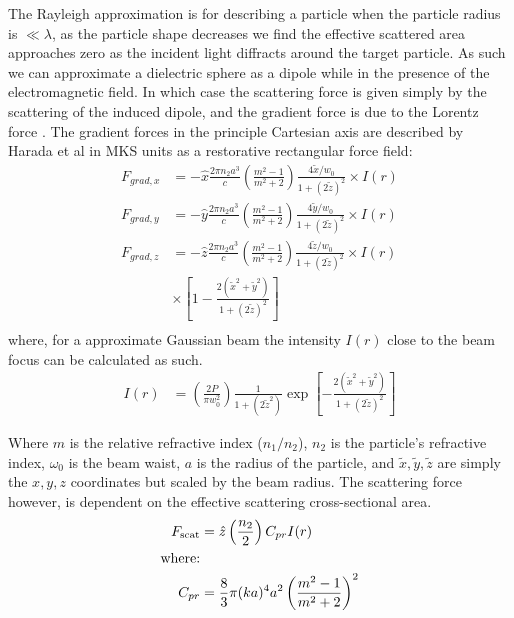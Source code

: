 The Rayleigh approximation is for describing a particle when 
the particle radius is $\ll \lambda$, as the particle shape 
decreases we find the effective scattered area approaches 
zero as the incident light diffracts around the target particle. 
As such we can approximate a dielectric sphere as a dipole while 
in the presence of the electromagnetic field. In which case the 
scattering force is given simply by the scattering of the induced 
dipole, and the gradient force is due to the Lorentz force 
\cite{Gordon1973}. The gradient forces in the principle Cartesian 
axis are described by Harada et al \cite{YasuhiroHarada1996} in MKS 
units as a restorative rectangular force field:
\begin{align}
  F_{grad,x}
  &=-\hat{x} \frac{2\pi n_2 a^3}{c}
    \left(\frac{m^2-1}{m^2+2}\right) \frac{4\tilde{x}/w_0}{1+(2\tilde{z})^2} \times I(r)
  \label{eq:Rayleigh_start}\\
  F_{grad,y}
  &=-\hat{y} \frac{2\pi n_2 a^3}{c}
    \left(\frac{m^2-1}{m^2+2}\right) \frac{4\tilde{y}/w_0}{1+(2\tilde{z})^2} \times I(r)
  \\
  F_{grad,z}
  &=-\hat{z} \frac{2\pi n_2 a^3}{c}
    \left(\frac{m^2-1}{m^2+2}\right) \frac{4\tilde{z}/w_0}{1+(2\tilde{z})^2}
    \nonumber \times I(r)
  \\ 
  & \times \left[1-\frac{2(\tilde{x}^2+\tilde{y}^2)}{1+(2\tilde{z})^2} \right]
  \\
  \label{eq:Rayleigh_end}
\end{align}
where, for a approximate Gaussian beam the intensity $I(r)$ 
close to the beam focus can be calculated as such.
\begin{align}
  \nonumber
	I(r) &= \left(\frac{2P}{\pi w_0^2}\right) \frac{1}{1+(2\tilde{z}^2)} 
	\exp \left[ - \frac{2(\tilde{x}^2+\tilde{y}^2)}{1+(2\tilde{z})^2} \right]
\end{align}

\noindent
Where $m$ is the relative refractive index ($n_1/n_2$), $n_2$ is 
the particle's refractive index, $\omega_0$ is the beam waist, 
$a$ is the radius of the particle, and $\tilde{x}, \tilde{y}, 
\tilde{z}$ are simply the $x, y, z$ coordinates but scaled by the 
beam radius. The scattering force however, is dependent on the 
effective scattering cross-sectional area. 
\begin{align}
  F_{\rm scat}
  &= \hat{z} \left(\frac{n_2}{2}\right) C_{pr} I(r) \\
  \text{where:} \nonumber \\
  C_{pr} &= \frac{8}{3} \pi (ka)^4 a^2 \left(\frac{m^2-1}{m^2+2}\right)^2
\end{align}

